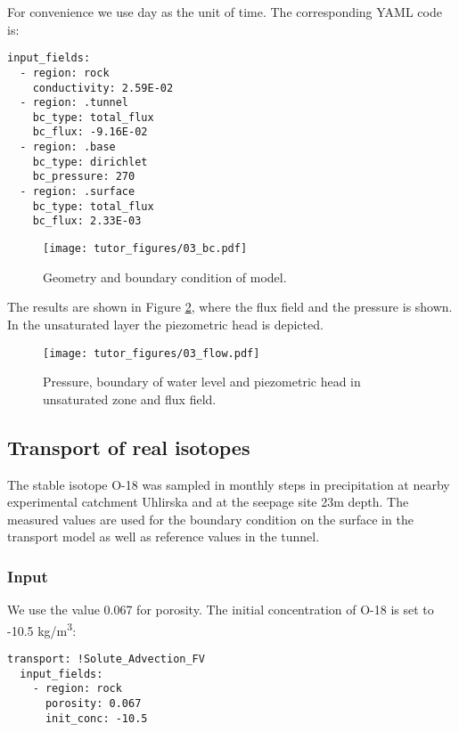 For convenience we use day as the unit of time. The corresponding YAML
code is:

\begin{verbatim}
input_fields:
  - region: rock
    conductivity: 2.59E-02
  - region: .tunnel
    bc_type: total_flux
    bc_flux: -9.16E-02
  - region: .base
    bc_type: dirichlet
    bc_pressure: 270
  - region: .surface
    bc_type: total_flux
    bc_flux: 2.33E-03
\end{verbatim}

\begin{figure}
\hypertarget{fig:tunnel_geom}{%
\centering
\texttt{[image: tutor\_figures/03\_bc.pdf]}
\caption{Geometry and boundary condition of
model.}\label{fig:tunnel_geom}
}
\end{figure}

The results are shown in Figure \ref{fig:flow}, where the flux field and
the pressure is shown. In the unsaturated layer the piezometric head is
depicted.

\begin{figure}
\hypertarget{fig:flow}{%
\centering
\texttt{[image: tutor\_figures/03\_flow.pdf]}
\caption{Pressure, boundary of water level and piezometric head in
unsaturated zone and flux field.}\label{fig:flow}
}
\end{figure}

\subsection{Transport of real isotopes}

The stable isotope O-18 was sampled in monthly steps in precipitation at
nearby experimental catchment Uhlirska and at the seepage site 23m
depth. The measured values are used for the boundary condition on the
surface in the transport model as well as reference values in the
tunnel.

\subsubsection{Input}

We use the value 0.067 for porosity. The initial concentration of O-18
is set to -10.5 kg/m\textsuperscript{3}:

\begin{verbatim}
transport: !Solute_Advection_FV
  input_fields:
    - region: rock
      porosity: 0.067
      init_conc: -10.5
\end{verbatim}

